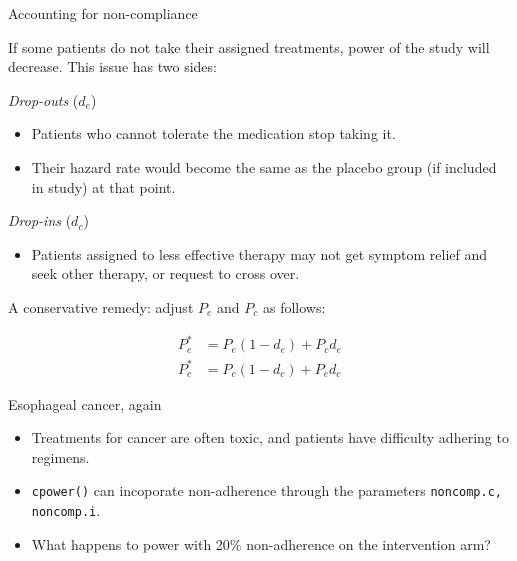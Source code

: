 \documentclass[ignorenonframetext,]{beamer}
\providecommand{\tightlist}{%
  \setlength{\itemsep}{0pt}\setlength{\parskip}{0pt}}
\begin{document}
\begin{frame}{%
\protect\hypertarget{accounting-for-non-compliance}{%
Accounting for non-compliance}}

If some patients do not take their assigned treatments, power of the
study will decrease. This issue has two sides:

\emph{Drop-outs} (\(d_e\))

\begin{itemize}
\item
  Patients who cannot tolerate the medication stop taking it.
\item
  Their hazard rate would become the same as the placebo group (if
  included in study) at that point.
\end{itemize}

\emph{Drop-ins} (\(d_c\))

\begin{itemize}
\tightlist
\item
  Patients assigned to less effective therapy may not get symptom relief
  and seek other therapy, or request to cross over.
\end{itemize}

A conservative remedy: adjust \(P_e\) and \(P_c\) as follows:

\begin{align*}
P_e^{*} &= P_e (1-d_e) + P_c d_e\\[1ex]
P_c^{*} &=  P_c (1-d_c) + P_e d_c
\end{align*}

\end{frame}

\begin{frame}{%
\protect\hypertarget{esophageal-cancer-again}{%
Esophageal cancer, again}}

\begin{itemize}
\item
  Treatments for cancer are often toxic, and patients have difficulty
  adhering to regimens.
\item
  \texttt{cpower()} can incoporate non-adherence through the parameters
  \texttt{noncomp.c, noncomp.i}.
\item
  What happens to power with 20\% non-adherence on the intervention arm?
\end{itemize}

\end{frame}
\end{document}
